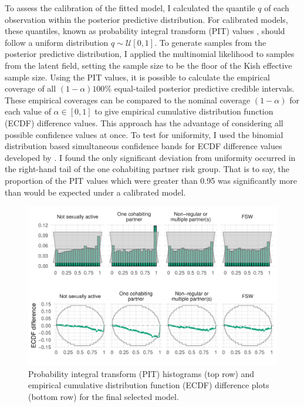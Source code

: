\documentclass[a4paper, nobind]{templates/ociamthesis}
\begin{document}
To assess the calibration of the fitted model, I calculated the quantile \(q\) of each observation within the posterior predictive distribution.
For calibrated models, these quantiles, known as probability integral transform (PIT) values \autocite{dawid1984present,bosse2022scoringutils}, should follow a uniform distribution \(q \sim \mathcal{U}[0, 1]\).
To generate samples from the posterior predictive distribution, I applied the multinomial likelihood to samples from the latent field, setting the sample size to be the floor of the Kish effective sample size.
Using the PIT values, it is possible to calculate the empirical coverage of all \((1 - \alpha)100\)\% equal-tailed posterior predictive credible intervals.
These empirical coverages can be compared to the nominal coverage \((1 - \alpha)\) for each value of \(\alpha \in [0, 1]\) to give empirical cumulative distribution function (ECDF) difference values.
This approach has the advantage of considering all possible confidence values at once.
To test for uniformity, I used the binomial distribution based simultaneous confidence bands for ECDF difference values developed by \textcite{sailynoja2021graphical}.
I found the only significant deviation from uniformity occurred in the right-hand tail of the one cohabiting partner risk group.
That is to say, the proportion of the PIT values which were greater than 0.95 was significantly more than would be expected under a calibrated model.



\begin{figure}

{\centering \includegraphics[width=0.95\linewidth]{resources/multi-agyw/20230627-144735-3da88508/depends/coverage} 

}

\caption{Probability integral transform (PIT) histograms (top row) and empirical cumulative distribution function (ECDF) difference plots (bottom row) for the final selected model.}\label{fig:coverage}
\end{figure}
\end{document}
